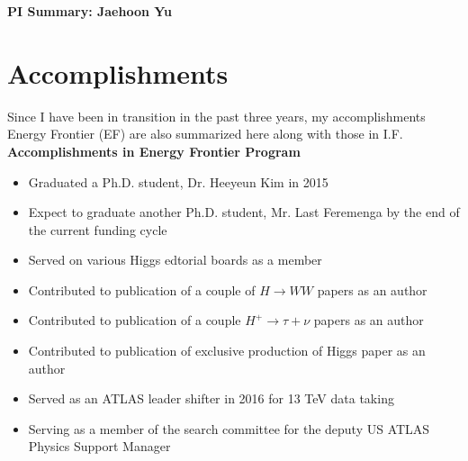\begin{center}
\LARGE\textbf{PI Summary: Jaehoon Yu}
\end{center}

\section*{\textbf{Accomplishments}}
Since I have been in transition in the past three years, my accomplishments Energy Frontier (EF) are also summarized here along with those in I.F. 
\noindent\textbf{}
\noindent\textbf{Accomplishments in Energy Frontier Program}
\begin{itemize}[noitemsep,nolistsep]
\item{Graduated a Ph.D. student, Dr. Heeyeun Kim in 2015}
\item{Expect to graduate another Ph.D. student, Mr. Last Feremenga by the end of the current funding cycle}
\item{Served on various Higgs edtorial boards as a member}
\item{Contributed to publication of a couple of $H\rightarrow WW$ papers as an author}
\item{Contributed to publication of a couple $H^{+}\rightarrow \tau+\nu$ papers as an author}
\item{Contributed to publication of exclusive production of Higgs paper as an author}
\item{Served as an ATLAS leader shifter in 2016 for 13 TeV data taking}
\item{Serving as a member of the search committee for the deputy US ATLAS Physics Support Manager}
\end{itemize}

